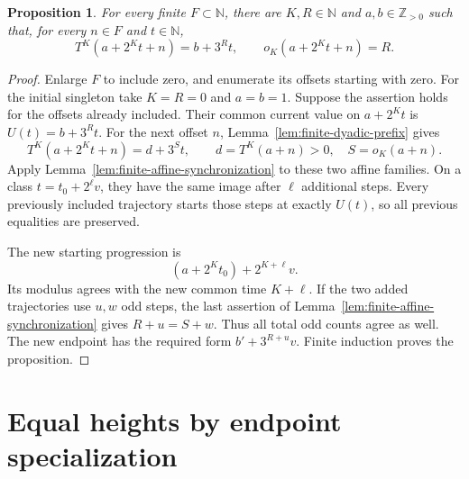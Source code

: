 \documentclass[11pt,a4paper]{article}
\newtheorem{proposition}[theorem]{Proposition}
\begin{document}
\begin{proposition}\label{prop:finite-pattern-coalescence}
For every finite $F\subset\mathbb N$, there are $K,R\in\mathbb N$
and $a,b\in\mathbb Z_{>0}$ such that, for every $n\in F$ and $t\in\mathbb N$,
\begin{equation}\label{eq:finite-pattern-coalescence}
T^K(a+2^Kt+n)=b+3^Rt,\qquad
o_K(a+2^Kt+n)=R.
\end{equation}
\end{proposition}
\begin{proof}
Enlarge $F$ to include zero, and enumerate its offsets starting with
zero. For the initial singleton take $K=R=0$ and $a=b=1$.
Suppose the assertion holds for the offsets already included.
Their common current value on $a+2^Kt$ is $U(t)=b+3^Rt$.
For the next offset $n$, Lemma~\ref{lem:finite-dyadic-prefix}
gives
\[
T^K(a+2^Kt+n)=d+3^St,
\qquad d=T^K(a+n)>0,\quad S=o_K(a+n).
\]
Apply Lemma~\ref{lem:finite-affine-synchronization} to these two
affine families. On a class $t=t_0+2^\ell v$, they have the
same image after $\ell$ additional steps. Every previously included
trajectory starts those steps at exactly $U(t)$, so all previous
equalities are preserved.

The new starting progression is
\[
(a+2^Kt_0)+2^{K+\ell}v.
\]
Its modulus agrees with the new common time $K+\ell$.
If the two added trajectories use $u,w$ odd steps, the last
assertion of Lemma~\ref{lem:finite-affine-synchronization} gives
$R+u=S+w$. Thus all total odd counts agree as well.
The new endpoint has the required form $b'+3^{R+u}v$.
Finite induction proves the proposition.
\end{proof}

\section{Equal heights by endpoint specialization}
\end{document}
